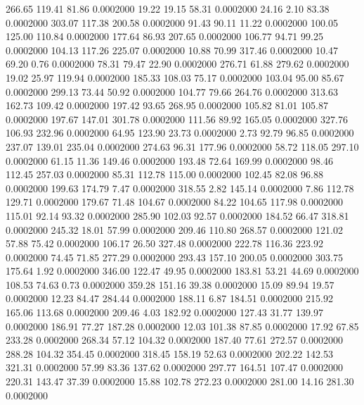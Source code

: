  266.65  119.41   81.86   0.0002000
  19.22   19.15   58.31   0.0002000
  24.16    2.10   83.38   0.0002000
 303.07  117.38  200.58   0.0002000
  91.43   90.11   11.22   0.0002000
 100.05  125.00  110.84   0.0002000
 177.64   86.93  207.65   0.0002000
 106.77   94.71   99.25   0.0002000
 104.13  117.26  225.07   0.0002000
  10.88   70.99  317.46   0.0002000
  10.47   69.20    0.76   0.0002000
  78.31   79.47   22.90   0.0002000
 276.71   61.88  279.62   0.0002000
  19.02   25.97  119.94   0.0002000
 185.33  108.03   75.17   0.0002000
 103.04   95.00   85.67   0.0002000
 299.13   73.44   50.92   0.0002000
 104.77   79.66  264.76   0.0002000
 313.63  162.73  109.42   0.0002000
 197.42   93.65  268.95   0.0002000
 105.82   81.01  105.87   0.0002000
 197.67  147.01  301.78   0.0002000
 111.56   89.92  165.05   0.0002000
 327.76  106.93  232.96   0.0002000
  64.95  123.90   23.73   0.0002000
   2.73   92.79   96.85   0.0002000
 237.07  139.01  235.04   0.0002000
 274.63   96.31  177.96   0.0002000
  58.72  118.05  297.10   0.0002000
  61.15   11.36  149.46   0.0002000
 193.48   72.64  169.99   0.0002000
  98.46  112.45  257.03   0.0002000
  85.31  112.78  115.00   0.0002000
 102.45   82.08   96.88   0.0002000
 199.63  174.79    7.47   0.0002000
 318.55    2.82  145.14   0.0002000
   7.86  112.78  129.71   0.0002000
 179.67   71.48  104.67   0.0002000
  84.22  104.65  117.98   0.0002000
 115.01   92.14   93.32   0.0002000
 285.90  102.03   92.57   0.0002000
 184.52   66.47  318.81   0.0002000
 245.32   18.01   57.99   0.0002000
 209.46  110.80  268.57   0.0002000
 121.02   57.88   75.42   0.0002000
 106.17   26.50  327.48   0.0002000
 222.78  116.36  223.92   0.0002000
  74.45   71.85  277.29   0.0002000
 293.43  157.10  200.05   0.0002000
 303.75  175.64    1.92   0.0002000
 346.00  122.47   49.95   0.0002000
 183.81   53.21   44.69   0.0002000
 108.53   74.63    0.73   0.0002000
 359.28  151.16   39.38   0.0002000
  15.09   89.94   19.57   0.0002000
  12.23   84.47  284.44   0.0002000
 188.11    6.87  184.51   0.0002000
 215.92  165.06  113.68   0.0002000
 209.46    4.03  182.92   0.0002000
 127.43   31.77  139.97   0.0002000
 186.91   77.27  187.28   0.0002000
  12.03  101.38   87.85   0.0002000
  17.92   67.85  233.28   0.0002000
 268.34   57.12  104.32   0.0002000
 187.40   77.61  272.57   0.0002000
 288.28  104.32  354.45   0.0002000
 318.45  158.19   52.63   0.0002000
 202.22  142.53  321.31   0.0002000
  57.99   83.36  137.62   0.0002000
 297.77  164.51  107.47   0.0002000
 220.31  143.47   37.39   0.0002000
  15.88  102.78  272.23   0.0002000
 281.00   14.16  281.30   0.0002000
